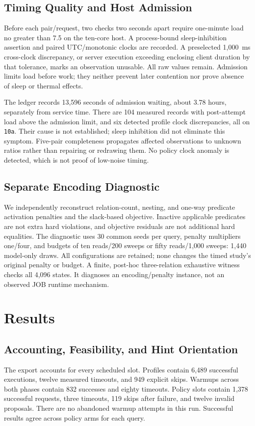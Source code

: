 \documentclass[conference]{IEEEtran}
\begin{document}
\subsection{Timing Quality and Host Admission}
Before each pair/request, two checks two seconds apart require one-minute load
no greater than 7.5 on the ten-core host. A process-bound sleep-inhibition
assertion and paired UTC/monotonic clocks are recorded. A preselected 1,000~ms
cross-clock discrepancy, or server execution exceeding enclosing client duration
by that tolerance, marks an observation unusable. All raw values remain.
Admission limits load before work; they neither prevent later contention nor
prove absence of sleep or thermal effects.

The ledger records 13,596 seconds of admission waiting, about 3.78 hours,
separately from service time. There are 104 measured records with post-attempt
load above the admission limit, and six detected profile clock discrepancies,
all on \texttt{10a}. Their cause is not established; sleep inhibition did not
eliminate this symptom. Five-pair completeness propagates affected observations
to unknown ratios rather than repairing or redrawing them. No policy clock
anomaly is detected, which is not proof of low-noise timing.

\subsection{Separate Encoding Diagnostic}
We independently reconstruct relation-count, nesting, and one-way predicate
activation penalties and the slack-based objective. Inactive applicable predicates
are not extra hard violations, and objective residuals are not additional hard
equalities. The diagnostic uses 30 common seeds per query, penalty multipliers
one/four, and budgets of ten reads/200 sweeps or fifty reads/1,000 sweeps: 1,440
model-only draws. All configurations are retained; none changes the timed study's
original penalty or budget. A finite, post-hoc three-relation exhaustive witness
checks all 4,096 states. It diagnoses an encoding/penalty instance, not an observed
JOB runtime mechanism.

\section{Results}
\subsection{Accounting, Feasibility, and Hint Orientation}
The export accounts for every scheduled slot. Profiles contain 6,489 successful
executions, twelve measured timeouts, and 949 explicit skips. Warmups across both
phases contain 832 successes and eighty timeouts. Policy slots contain 1,378
successful requests, three timeouts, 119 skips after failure, and twelve invalid
proposals. There are no abandoned warmup attempts in this run. Successful results
agree across policy arms for each query.
\end{document}
